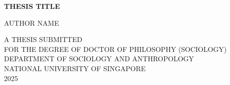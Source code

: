 \begin{titlepage}
    \begin{center}
        \vspace*{2cm}

        \Large
        {\bf THESIS TITLE}

        \vspace{4cm}

        \large
        AUTHOR NAME

        \vfill

        \normalsize
        A THESIS SUBMITTED\\[0.3cm]
        FOR THE DEGREE OF DOCTOR OF PHILOSOPHY (SOCIOLOGY)\\
        DEPARTMENT OF SOCIOLOGY AND ANTHROPOLOGY\\
        NATIONAL UNIVERSITY OF SINGAPORE\\[2cm]

        2025

    \end{center}
\end{titlepage}